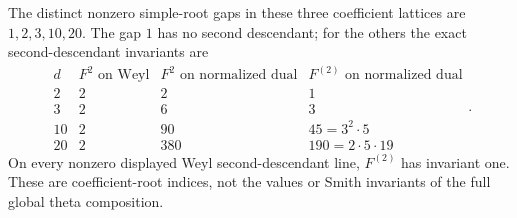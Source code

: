 The distinct nonzero simple-root gaps in these three coefficient
lattices are $1,2,3,10,20$. The gap $1$ has no second descendant; for
the others the exact second-descendant invariants are
\[
\begin{array}{c|c|c|c}
 d&F^2\text{ on Weyl}&F^2\text{ on normalized dual}
       &F^{(2)}\text{ on normalized dual}\\\hline
 2&2&2&1\\
 3&2&6&3\\
 10&2&90&45=3^2\cdot5\\
 20&2&380&190=2\cdot5\cdot19
\end{array}.                                                    \tag{IF-11e}
\]
On every nonzero displayed Weyl second-descendant line,
$F^{(2)}$ has invariant one. These are coefficient-root indices,
not the values or Smith invariants of the full global theta composition.

